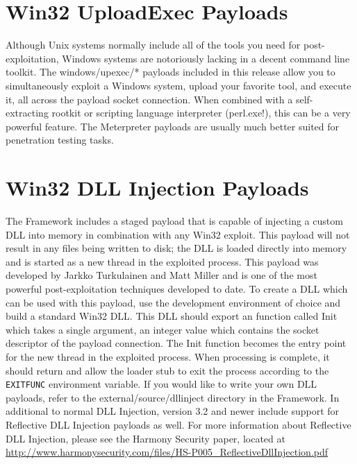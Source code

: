 \documentclass{report}
\begin{document}
\section{Win32 UploadExec Payloads}
\par
Although Unix systems normally include all of the tools you need for
post-exploitation, Windows systems are notoriously lacking in a decent command
line toolkit. The windows/upexec/* payloads included in this release allow you to
simultaneously exploit a Windows system, upload your favorite tool, and execute
it, all across the payload socket connection. When combined with a
self-extracting rootkit or scripting language interpreter (perl.exe!), this can
be a very powerful feature. The Meterpreter payloads are usually much better
suited for penetration testing tasks.  

\section{Win32 DLL Injection Payloads}
\par
The Framework includes a staged payload that is
capable of injecting a custom DLL into memory in combination with any Win32
exploit. This payload will not result in any files being written to disk; the
DLL is loaded directly into memory and is started as a new thread in the
exploited process. This payload was developed by Jarkko Turkulainen and Matt
Miller and is one of the most powerful post-exploitation techniques developed
to date. To create a DLL which can be used with this payload, use the
development environment of choice and build a standard Win32 DLL. This DLL
should export an function called Init which takes a single argument, an
integer value which contains the socket descriptor of the payload connection.
The Init function becomes the entry point for the new thread in the exploited
process. When processing is complete, it should return and allow the loader
stub to exit the process according to the \texttt{EXITFUNC} environment
variable. If you would like to write your own DLL payloads, refer to the
external/source/dllinject directory in the Framework. In additional to normal
DLL Injection, version 3.2 and newer include support for Reflective DLL Injection
payloads as well. For more information about Reflective DLL Injection, please see
the Harmony Security paper, located at 
\url{http://www.harmonysecurity.com/files/HS-P005_ReflectiveDllInjection.pdf}
\end{document}
